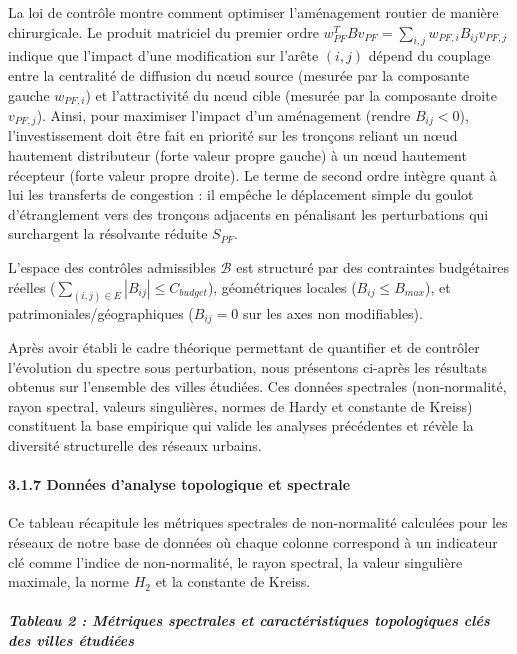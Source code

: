 \documentclass[10pt, a4paper]{article}
\begin{document}
La loi de contrôle montre comment optimiser l'aménagement routier de
manière chirurgicale. Le produit matriciel du premier ordre
\(w_{PF}^T B v_{PF} = \sum_{i,j} w_{PF, i} B_{ij} v_{PF, j}\) indique
que l'impact d'une modification sur l'arête \((i, j)\) dépend du
couplage entre la centralité de diffusion du nœud source (mesurée par la
composante gauche \(w_{PF, i}\)) et l'attractivité du nœud cible
(mesurée par la composante droite \(v_{PF, j}\)). Ainsi, pour maximiser
l'impact d'un aménagement (rendre \(B_{ij} < 0\)), l'investissement doit
être fait en priorité sur les tronçons reliant un nœud hautement
distributeur (forte valeur propre gauche) à un nœud hautement récepteur
(forte valeur propre droite). Le terme de second ordre intègre quant à
lui les transferts de congestion : il empêche le déplacement simple du
goulot d'étranglement vers des tronçons adjacents en pénalisant les
perturbations qui surchargent la résolvante réduite \(S_{PF}\).

L'espace des contrôles admissibles \(\mathcal{B}\) est structuré par des
contraintes budgétaires réelles
(\(\sum_{(i,j) \in E} |B_{ij}| \le C_{budget}\)), géométriques locales
(\(B_{ij} \le B_{max}\)), et patrimoniales/géographiques (\(B_{ij} = 0\)
sur les axes non modifiables).

Après avoir établi le cadre théorique permettant de quantifier et de
contrôler l'évolution du spectre sous perturbation, nous présentons
ci-après les résultats obtenus sur l'ensemble des villes étudiées. Ces
données spectrales (non-normalité, rayon spectral, valeurs singulières,
normes de Hardy et constante de Kreiss) constituent la base empirique
qui valide les analyses précédentes et révèle la diversité structurelle
des réseaux urbains.

\paragraph{3.1.7 Données d'analyse topologique et
spectrale}\label{donnuxe9es-danalyse-topologique-et-spectrale}

Ce tableau récapitule les métriques spectrales de non-normalité
calculées pour les réseaux de notre base de données où chaque colonne
correspond à un indicateur clé comme l'indice de non-normalité, le rayon
spectral, la valeur singulière maximale, la norme \(H_2\) et la
constante de Kreiss.

\subparagraph{Tableau 2 : Métriques spectrales et caractéristiques
topologiques clés des villes
étudiées}\label{tableau-2-muxe9triques-spectrales-et-caractuxe9ristiques-topologiques-cluxe9s-des-villes-uxe9tudiuxe9es}
\end{document}

